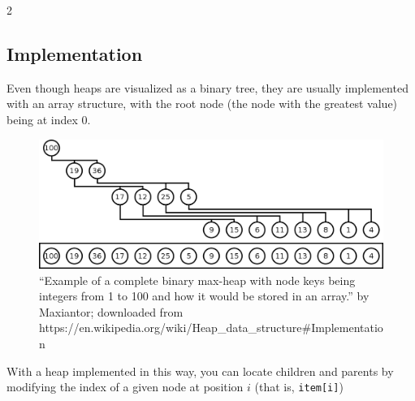 \documentclass[a4paper,12pt,oneside]{book}
\newcounter{question}
\begin{document}
\begin{question}{\thequestion}{2}
\begin{enumerate}
        \end{enumerate}

    \end{question}

    \newpage

    \subsection{Implementation}

    Even though heaps are visualized as a binary tree, they are usually
    implemented with an array structure, with the root node (the node with
    the greatest value) being at index 0.

    \begin{figure}[h]
        \begin{center}
            \includegraphics[width=14cm]{images/temp_heap-as-array_wikipedia_maxiantor_cc-share-alike4.png}
        \end{center}

        \caption{``Example of a complete binary max-heap with node keys being integers from 1 to 100 and how it would be stored in an array.'' by Maxiantor;
                    downloaded from https://en.wikipedia.org/wiki/Heap\_data\_structure\#Implementation}
    \end{figure}

    With a heap implemented in this way, you can locate children and parents by modifying the index of a given node at position $i$ (that is, \texttt{item[i]})
\end{document}

